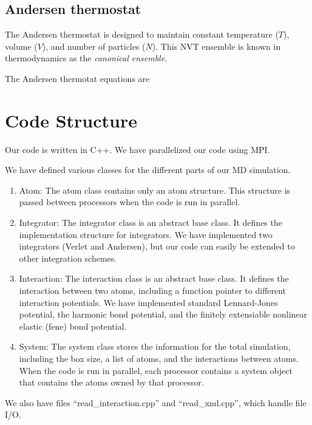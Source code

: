 \documentclass[10pt]{article}
\begin{document}
\subsection{Andersen thermostat}
The Andersen thermostat is designed to maintain constant temperature ($T$), volume ($V$), and number of particles ($N$).  
%
This NVT ensemble is known in thermodynamics as the {\em canonical ensemble}.

The Andersen thermotat equations are
$$ 
\section{Code Structure}
Our code is written in C++. 
%
We have parallelized our code using MPI. 
%

We have defined various classes for the different parts of our MD simulation. 
%
\begin{enumerate}
\item Atom: The atom class contains only an atom structure. This structure is passed between processors when the code is run in parallel.
\item Integrator: The integrator class is an abstract base class. It defines the implementation structure for integrators. We have implemented two integrators (Verlet and Andersen), but our code can easily be extended to other integration schemes. 
\item Interaction: The interaction class is an abstract base class. It defines the interaction between two atoms, including a function pointer to different interaction potentials. We have implemented standard Lennard-Jones potential, the harmonic bond potential, and the finitely extensiable nonlinear elastic (fene) bond potential. 
\item System: The system class stores the information for the total simulation, including the box size, a list of atoms, and the interactions between atoms. When the code is run in parallel, each processor contains a system object that contains the atoms owned by that processor.
\end{enumerate}

We also have files ``read\_interaction.cpp'' and ``read\_xml.cpp'', which handle file I/O. 
%
\end{document}
